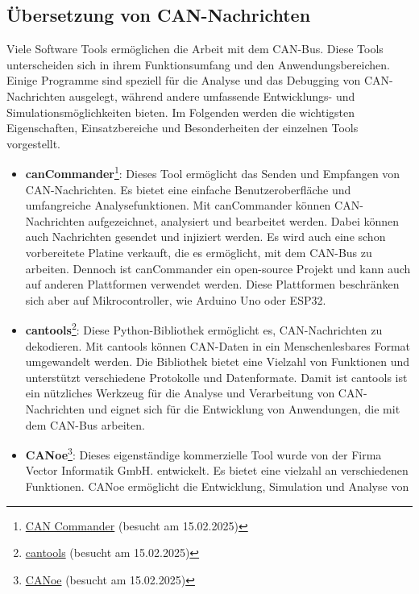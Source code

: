 \subsection{Übersetzung von CAN-Nachrichten} \label{sec:canTranslation}
Viele Software Tools ermöglichen die Arbeit mit dem CAN-Bus. Diese Tools unterscheiden sich in ihrem Funktionsumfang
und den Anwendungsbereichen.
Einige Programme sind speziell für die Analyse und das Debugging von CAN-Nachrichten 
ausgelegt, während andere umfassende Entwicklungs- und Simulationsmöglichkeiten bieten. Im Folgenden werden die wichtigsten 
Eigenschaften, Einsatzbereiche und Besonderheiten der einzelnen Tools vorgestellt. \\
\begin{itemize}
    \item \textbf{canCommander}\footnote{\href{https://github.com/MatthewKuKanich/CAN_Commander}{CAN Commander} (besucht am 15.02.2025)}: 
    Dieses Tool ermöglicht das Senden und Empfangen von CAN-Nachrichten. Es bietet eine einfache 
    Benutzeroberfläche und umfangreiche Analysefunktionen. Mit canCommander können CAN-Nachrichten aufgezeichnet, 
    analysiert und bearbeitet werden. Dabei können auch Nachrichten gesendet und injiziert werden. Es wird auch eine
    schon vorbereitete Platine verkauft, die es ermöglicht, mit dem CAN-Bus zu arbeiten. Dennoch ist canCommander ein
    open-source Projekt und kann auch auf anderen Plattformen verwendet werden. Diese Plattformen beschränken sich aber
    auf Mikrocontroller, wie Arduino Uno oder 
    ESP32.
    \item \textbf{cantools}\footnote{\href{https://github.com/cantools/cantools/releases}{cantools} (besucht am 15.02.2025)}: 
    Diese Python-Bibliothek ermöglicht es, CAN-Nachrichten zu dekodieren. Mit cantools können 
    CAN-Daten in ein Menschenlesbares Format umgewandelt werden. Die Bibliothek 
    bietet eine Vielzahl von Funktionen und unterstützt verschiedene Protokolle und Datenformate. Damit ist cantools ist ein 
    nützliches Werkzeug für die Analyse und Verarbeitung von CAN-Nachrichten und eignet sich für die Entwicklung von 
    Anwendungen, die mit dem CAN-Bus arbeiten.
    \item \textbf{CANoe}\footnote{\href{https://www.vector.com/de/de/produkte/produkte-a-z/software/canoe/}{CANoe} (besucht am 15.02.2025)}: 
    Dieses eigenständige kommerzielle Tool wurde von der Firma Vector Informatik GmbH. entwickelt.
    Es bietet eine vielzahl an verschiedenen Funktionen. CANoe ermöglicht die Entwicklung, Simulation und Analyse von

\end{itemize}
